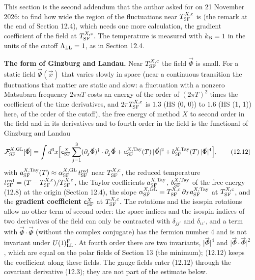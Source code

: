 \documentclass[
  10pt,
]{article}
\begin{document}
This section is the second addendum that the author asked for on 21
November 2026: to find how wide the region of the fluctuations near
\(T^{X,{\rm c}}_{\rm SF}\) is (the remark at the end of Section 12.4),
which needs one more calculation, the gradient coefficient of the field
at \(T^{X,{\rm c}}_{\rm SF}\). The temperature is measured with
\(k_{\rm B}=1\) in the units of the cutoff \(\Lambda_{\rm LL}=1\), as in
Section 12.4.

\textbf{The form of Ginzburg and Landau.} Near
\(T^{X,{\rm c}}_{\rm SF}\) the field \(\vec\Phi\) is small. For a static
field \(\vec\Phi(\vec x)\) that varies slowly in space (near a
continuous transition the fluctuations that matter are static and slow:
a fluctuation with a nonzero Matsubara frequency \(2\pi nT\) costs an
energy of the order of \((2\pi T)^2\) times the coefficient of the time
derivatives, and \(2\pi T^{X,{\rm c}}_{\rm SF}\) is \(1.3\) (HS (0, 0))
to \(1.6\) (HS (1, 1)) here, of the order of the cutoff), the free
energy of method \(X\) to second order in the field and in its
derivatives and to fourth order in the field is the functional of
Ginzburg and Landau
\[\mathcal F^{X,{\rm GL}}_{\rm SF}[\vec\Phi]=\int d^3x\Big[\mathsf c^X_{\rm SF}\sum_{j=1}^3(\partial_j\vec\Phi)^\dagger\cdot\partial_j\vec\Phi+a^{X,{\rm Tay}}_{\rm SF}(T)\,\lvert\vec\Phi\rvert^2+b^{X,{\rm Tay}}_{\rm SF}(T)\,\lvert\vec\Phi\rvert^4\Big],\tag{12.12}\]
with
\(a^{X,{\rm Tay}}_{\rm SF}(T)\approx\alpha^{X,{\rm GL}}_{\rm SF}\,t^{\rm red}_{\rm SF}\)
near \(T^{X,{\rm c}}_{\rm SF}\), the reduced temperature
\(t^{\rm red}_{\rm SF}=(T-T^{X,{\rm c}}_{\rm SF})/T^{X,{\rm c}}_{\rm SF}\),
the Taylor coefficients \(a^{X,{\rm Tay}}_{\rm SF}\),
\(b^{X,{\rm Tay}}_{\rm SF}\) of the free energy (12.8) at the origin
(Section 12.4), the slope
\(\alpha^{X,{\rm GL}}_{\rm SF}=T^{X,{\rm c}}_{\rm SF}\,\partial_Ta^{X,{\rm Tay}}_{\rm SF}\)
at \(T^{X,{\rm c}}_{\rm SF}\), and the \textbf{gradient coefficient}
\(\mathsf c^X_{\rm SF}\) at \(T^{X,{\rm c}}_{\rm SF}\). The rotations
and the isospin rotations allow no other term of second order: the space
indices and the isospin indices of two derivatives of the field can only
be contracted with \(\delta_{jj'}\) and \(\delta_{\iota\iota'}\), and a
term with \(\vec\Phi\cdot\vec\Phi\) (without the complex conjugate) has
the fermion number 4 and is not invariant under
\(U(1)^{\rm F}_{\rm LL}\). At fourth order there are two invariants,
\(\lvert\vec\Phi\rvert^4\) and \(\lvert\vec\Phi\cdot\vec\Phi\rvert^2\),
which are equal on the polar fields of Section 13 (the minimum); (12.12)
keeps the coefficient along these fields. The gauge fields enter (12.12)
through the covariant derivative (12.3); they are not part of the
estimate below.
\end{document}

